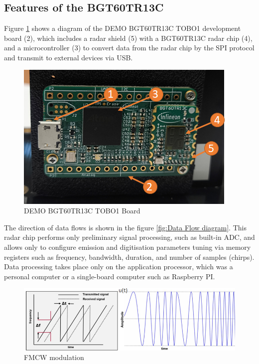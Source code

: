 
\subsection{Features of the BGT60TR13C}

Figure \ref{fig:BGT60TR13CBoard} shows a diagram of the DEMO BGT60TR13C TOBO1 development board (2), which includes a radar shield (5) with a BGT60TR13C radar chip (4), and a microcontroller (3) to convert data from the radar chip by the SPI protocol and transmit to external devices via USB.

\begin{figure}[H]
    \centering
    \includegraphics[width=0.5\linewidth]{Src/images/BGTdevBoard.png}
    \caption{DEMO BGT60TR13C TOBO1 Board}
    \label{fig:BGT60TR13CBoard}
\end{figure}

The direction of data flows is shown in the figure \ref{fig:Data Flow diagram}. This radar chip performs only preliminary signal processing, such as built-in ADC, and allows only to configure emission and digitisation parameters tuning via memory registers such as frequency, bandwidth, duration, and number of samples (chirps). Data processing takes place only on the application processor, which was a personal computer or a single-board computer such as Raspberry PI.






\begin{figure}[H]
    \centering
    \includegraphics[width=0.85\linewidth]{FMCW.png}
    \caption{FMCW modulation}
    \label{fig:FMCW}
\end{figure}




